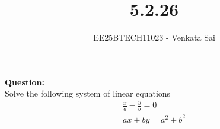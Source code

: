 \documentclass[journal]{IEEEtran}
\begin{document}


\title{5.2.26}
\author{EE25BTECH11023 - Venkata Sai}
\maketitle \vspace{-1cm}
\renewcommand{\thefigure}{\theenumi}
\renewcommand{\thetable}{\theenumi}
\setlength{\intextsep}{10pt} %

\renewcommand{\thetable}{\theenumi}

\textbf{Question:}  \\
Solve the following system of linear equations
\begin{align}
\frac{x}{a}-\frac{y}{b}=0 \\
ax+by=a^{2}+b^{2}
\end{align}
\end{document}
